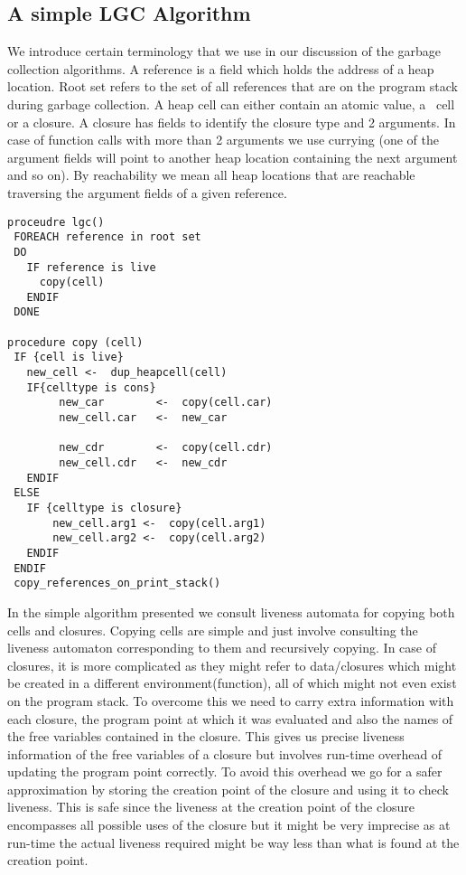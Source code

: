 \documentclass[9pt]{sigplanconf}
\newcommand{\cred}[1]{{\color{red}{#1}}}
\begin{document}
\subsection{A simple LGC Algorithm}
\cred{Introduce terminology}
We introduce certain terminology that we use in our discussion of the 
garbage collection algorithms. A reference is a field which holds the 
address of a heap location. Root set refers to the set of all references 
that are on the program stack during garbage collection.
A heap cell can either contain an atomic value, a \CONS\ cell or a closure. A closure 
has fields to identify the closure type and 2 arguments. In case of function calls 
with more than 2 arguments we use currying (one of the argument fields will point to another
 heap location containing the next argument and so on). By reachability we mean all heap 
locations that are reachable traversing the argument fields of a given reference.
\begin{verbatim}
proceudre lgc()
 FOREACH reference in root set
 DO
   IF reference is live
     copy(cell)
   ENDIF
 DONE

procedure copy (cell)
 IF {cell is live}
   new_cell <-  dup_heapcell(cell)
   IF{celltype is cons}
        new_car        <-  copy(cell.car)
        new_cell.car   <-  new_car
      
        new_cdr        <-  copy(cell.cdr)
        new_cell.cdr   <-  new_cdr
   ENDIF
 ELSE
   IF {celltype is closure}
       new_cell.arg1 <-  copy(cell.arg1)
       new_cell.arg2 <-  copy(cell.arg2)
   ENDIF
 ENDIF
 copy_references_on_print_stack()
\end{verbatim}
In the simple algorithm presented we consult liveness automata for copying both \CONS cells and closures. 
Copying \CONS cells are simple and just involve consulting the liveness automaton corresponding to them 
and recursively copying. In case of closures, it is more complicated as they might refer to data/closures 
which might be created in a different environment(function), all of
which might not even exist on the program stack. To overcome this we need to carry extra information 
with each closure, the program point at which it was evaluated and also the names of the free 
variables contained in the closure. This gives us precise liveness information of the free variables of a 
closure but involves run-time overhead of updating the program point correctly. To avoid this overhead we 
go for a safer approximation by storing the creation point of the closure and using it to check liveness. 
This is safe since the liveness at the creation point of the closure encompasses all possible uses of the 
closure but it might be very imprecise as at run-time the actual liveness required might be way less than 
what is found at the creation point. 
\end{document}
